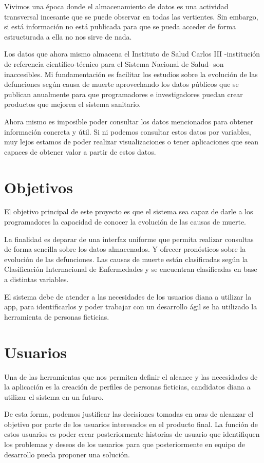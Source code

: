 Vivimos una época donde el almacenamiento de datos es una actividad transversal incesante
que se puede observar en todas las vertientes. Sin embargo, si está información no está
publicada para que se pueda acceder de forma estructurada a ella no nos sirve de nada. 

Los datos que ahora mismo almacena el Instituto de Salud Carlos III -institución de
referencia científico-técnico para el Sistema Nacional de Salud- son inaccesibles.  Mi
fundamentación es facilitar los estudios sobre la evolución de las defunciones según causa
de muerte aprovechando los datos públicos que se publican anualmente para que
programadores e investigadores puedan crear productos que mejoren el sistema sanitario.

Ahora mismo es imposible poder consultar los datos mencionados para obtener información
concreta y útil.  Si ni podemos consultar estos datos por variables, muy lejos estamos de
poder realizar visualizaciones o tener aplicaciones que sean capaces de obtener valor a
partir de estos datos.

\section{Objetivos}
\label{sec:obj}
El objetivo principal de este proyecto es que el sistema sea capaz de darle a los
programadores la capacidad de conocer la evolución de las causas de muerte. 

La finalidad es deparar de una interfaz uniforme que permita realizar consultas de forma
sencilla sobre los datos almacenados. Y ofrecer pronósticos sobre la evolución de las
defunciones. Las causas de muerte están clasificadas según la Clasificación Internacional
de Enfermedades y se encuentran clasificadas en base a distintas variables. 

El sistema debe de atender a las necesidades de los usuarios diana a utilizar la app, para
identificarlos y poder trabajar con un desarrollo ágil se ha utilizado la herramienta de
personas ficticias.

\section{Usuarios}
\label{sec:usu}
Una de las herramientas que nos permiten definir el alcance y las necesidades de la
aplicación es la creación de perfiles de personas ficticias, candidatos diana a utilizar
el sistema en un futuro.

De esta forma, podemos justificar las decisiones tomadas en aras de alcanzar el objetivo
por parte de los usuarios interesados en el producto final. La función de estos usuarios
es poder crear posteriormente historias de usuario que identifiquen los problemas y deseos
de los usuarios para que posteriormente en equipo de desarrollo pueda proponer una
solución.

